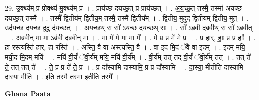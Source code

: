 \documentclass[17pt]{extarticle}
\begin{document}
29. उ॒क्थ्य॑म् प्र प्रोक्थ्य॑ मु॒क्थ्य॑म् प्र । . प्राय॑च्छ दयच्छ॒त् प्र प्राय॑च्छत् । . अ॒य॒च्छ॒त् तस्मै॒ तस्मा॑ अयच्छ दयच्छ॒त् तस्मै᳚ । . तस्मै᳚ द्वि॒तीय॑म् द्वि॒तीय॒म् तस्मै॒ तस्मै᳚ द्वि॒तीय᳚म् । . द्वि॒तीय॒ मुदुद् द्वि॒तीय॑म् द्वि॒तीय॒ मुत् । . उद॑यच्छ दयच्छ॒ दुदु द॑यच्छत् । . अ॒य॒च्छ॒थ् स सो॑ ऽयच्छ दयच्छ॒थ् सः । . सो᳚ ऽब्रवी दब्रवी॒थ् स सो᳚ ऽब्रवीत् । . अ॒ब्र॒वी॒न् मा मा ऽब्र॑वी दब्रवी॒न् मा । . मा मे॑ मे॒ मा मा मे᳚ । . मे॒ प्र प्र मे॑ मे॒ प्र । . प्र हार्॑. हाः॒ प्र प्र हाः᳚ । . हा॒ रस्त्यस्ति॑ हार्. हा॒ रस्ति॑ । . अस्ति॒ वै वा अस्त्यस्ति॒ वै । . वा इ॒द मि॒दं ॅवै वा इ॒दम् । . इ॒दम् मयि॒ मयी॒द मि॒दम् मयि॑ । . मयि॑ वी॒र्यं॑ ॅवी॒र्य॑म् मयि॒ मयि॑ वी॒र्य᳚म् । . वी॒र्य॑म् तत् तद् वी॒र्यं॑ ॅवी॒र्य॑म् तत् । . तत् ते॑ ते॒ तत् तत् ते᳚ । . ते॒ प्र प्र ते॑ ते॒ प्र । . प्र दा᳚स्यामि दास्यामि॒ प्र प्र दा᳚स्यामि । . दा॒स्या॒ मीतीति॑ दास्यामि दास्या॒ मीति॑ । . इति॒ तस्मै॒ तस्मा॒ इतीति॒ तस्मै᳚ । \newline

\textbf{Ghana Paata } \newline
\end{document}

